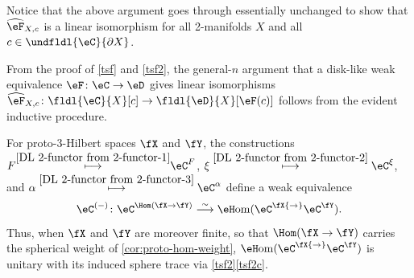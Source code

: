 \documentclass[12pt,reqno]{amsart}
\newcounter{alpha}\renewcommand\thealpha{\upshape\Alph{alpha}}
\newcommand{\eFun}{{\eH}\mathrm{om}}
\newcommand{\C}{\eC}
\newcommand{\D}{\eD}
\begin{document}
\begin{remark}
Notice that the above argument goes through essentially unchanged to show that $\widehat\eF_{X,c}$ is a linear isomorphism for all 2-manifolds $X$ and all $c\in\undfldl{\C}{\partial X}$.
\end{remark}

\begin{remark}
From the proof of \cref{tsf} and \cref{tsf2}, the general-$n$ argument that a disk-like weak equivalence $\eF\colon\C\to\D$ gives linear isomorphisms $\widehat\eF_{X,c}\colon\fldl{\C}{X}[c]\to\fldl{\D}{X}[\eF(c)]$ follows from the evident inductive procedure.
\end{remark}

\begin{theorem}
  \label{DL-thing-ii}
  For proto-3-Hilbert spaces $\fX$ and $\fY$, the constructions $F \smash{\overset{\eqref{DL 2-functor from 2-functor-1}}\longmapsto}\C^F$, $\xi\overset{\eqref{DL 2-functor from 2-functor-2}}\longmapsto\C^\xi$, and $\alpha\overset{\eqref{DL 2-functor from 2-functor-3}}\longmapsto\C^\alpha$ define a weak equivalence
  \[
    \C^{(-)}\colon \C^{{\Hom}(\fX\to\fY)} \overset\sim\longrightarrow\eFun(\C^\fX{\to}\C^\fY).
  \]
  Thus, when $\fX$ and $\fY$ are moreover finite, so that $\Hom(\fX\to\fY)$ carries the spherical weight of \cref{cor:proto-hom-weight}, $\eFun(\C^\fX{\to}\C^\fY)$ is unitary with its induced sphere trace via \cref{tsf2}\ref{tsf2c}.
\end{theorem}
\end{document}
